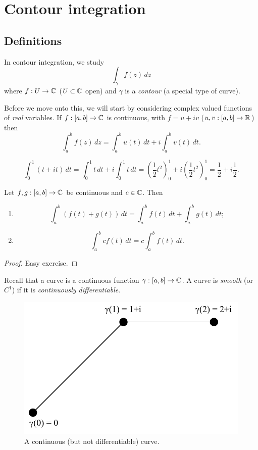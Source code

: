 \chapter{Contour integration}
\section{Definitions}

In contour integration, we study 
\[ \int_{\gamma} f(z) \, dz \]
where $f: U \to \mathbb{C}$ ($U \subset \mathbb{C}$ open) and 
$\gamma$ is a \emph{contour} (a special type of curve). 

Before we move onto this, we will start by considering complex valued functions
of \emph{real} variables.
If $f: [a, b] \to \mathbb{C}$ is continuous, with $f = u + iv$ ($u, v: [a, b] \to \mathbb{R}$) then
\[ \int_a^b f(z) \, dz = \int_a^b u(t) \, dt + i \int_a^b v(t) \, dt.\]

\begin{example}
    \[ \int_0^1 (t + it) \, dt =
        \int_0^1 t \, dt + i \int_0^1 t \, dt =
        \left(\frac12t^2\right)^1_0 + i\left(\frac12t^2\right)^1_0 =
        \frac12 + i\frac12.
    \]
\end{example}

\begin{lemma}[]
    Let $f, g: [a, b] \to \mathbb{C}$ be continuous and $c \in \mathbb{C}$. Then
    \begin{enumerate}
        \item 
            \[ \int_a^b(f(t) + g(t)) \, dt = \int_a^b f(t) \, dt + \int_a^b g(t) \, dt; \]

        \item
            \[ \int_a^b cf(t) \, dt = c \int_a^b f(t) \, dt. \]
    \end{enumerate}
\end{lemma}

\begin{proof}
    Easy exercise.
\end{proof}

\begin{remark}
    Recall that a curve is a continuous function $\gamma: [a, b] \to \mathbb{C}$.
    A curve is \emph{smooth} (or $C^1$) if it is \emph{continuously differentiable}.
\end{remark}

\begin{figure}
    \centering
    \includegraphics[width=0.6\linewidth]{images/continuous-curve-ex.pdf}
    \caption{A continuous (but not differentiable) curve.}%
    \label{fig:continuous-curve-ex}
\end{figure}

